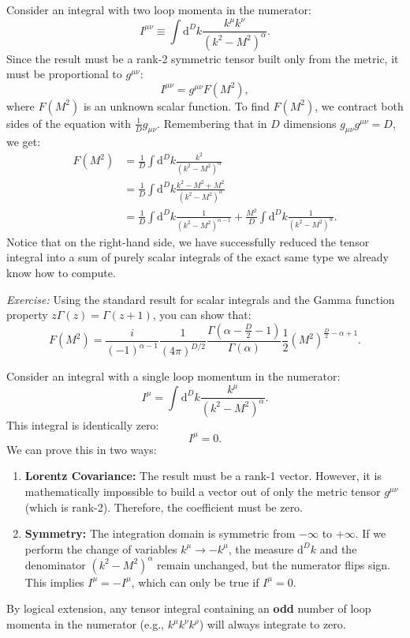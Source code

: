 \begin{example}
    Consider an integral with two loop momenta in the numerator:
    \[
        I^{\mu\nu} \equiv \int \mathrm{d}^D k \frac{k^\mu k^\nu}{(k^2 - M^2)^\alpha}.
    \]
    Since the result must be a rank-2 symmetric tensor built only from the metric, it must be proportional to $g^{\mu\nu}$:
    \[
        I^{\mu\nu} = g^{\mu\nu} F(M^2),
    \]
    where $F(M^2)$ is an unknown scalar function. To find $F(M^2)$, we contract both sides of the equation with $\frac{1}{D} g_{\mu\nu}$. Remembering that in $D$ dimensions $g_{\mu\nu} g^{\mu\nu} = D$, we get:
    \[
        \begin{aligned}
            F(M^2) & = \frac{1}{D} \int \mathrm{d}^D k \frac{k^2}{(k^2 - M^2)^\alpha}                                                                     \\
                   & = \frac{1}{D} \int \mathrm{d}^D k \frac{k^2 - M^2 + M^2}{(k^2 - M^2)^\alpha}                                                         \\
                   & = \frac{1}{D} \int \mathrm{d}^D k \frac{1}{(k^2 - M^2)^{\alpha-1}} + \frac{M^2}{D} \int \mathrm{d}^D k \frac{1}{(k^2 - M^2)^\alpha}.
        \end{aligned}
    \]
    Notice that on the right-hand side, we have successfully reduced the tensor integral into a sum of purely scalar integrals of the exact same type we already know how to compute.

    \textit{Exercise:} Using the standard result for scalar integrals and the Gamma function property $z\Gamma(z) = \Gamma(z+1)$, you can show that:
    \[
        F(M^2) = \frac{i}{(-1)^{\alpha-1}} \frac{1}{(4\pi)^{D/2}} \frac{\Gamma\left(\alpha - \frac{D}{2} - 1\right)}{\Gamma(\alpha)} \frac{1}{2} (M^2)^{\frac{D}{2} - \alpha + 1}.
    \]
\end{example}

\begin{example}
    Consider an integral with a single loop momentum in the numerator:
    \[
        I^\mu = \int \mathrm{d}^D k \frac{k^\mu}{(k^2 - M^2)^\alpha}.
    \]
    This integral is identically zero:
    \[
        I^\mu = 0.
    \]
    We can prove this in two ways:
    \begin{enumerate}
        \item \textbf{Lorentz Covariance:} The result must be a rank-1 vector. However, it is mathematically impossible to build a vector out of only the metric tensor $g^{\mu\nu}$ (which is rank-2). Therefore, the coefficient must be zero.
        \item \textbf{Symmetry:} The integration domain is symmetric from $-\infty$ to $+\infty$. If we perform the change of variables $k^\mu \to -k^\mu$, the measure $\mathrm{d}^D k$ and the denominator $(k^2 - M^2)^\alpha$ remain unchanged, but the numerator flips sign. This implies $I^\mu = -I^\mu$, which can only be true if $I^\mu = 0$.
    \end{enumerate}
    By logical extension, any tensor integral containing an \textbf{odd} number of loop momenta in the numerator (e.g., $k^\mu k^\nu k^\rho$) will always integrate to zero.
\end{example}

